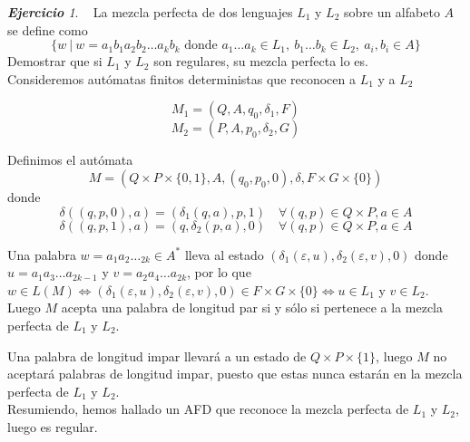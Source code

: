 \documentclass[12pt,spanish]{article}
\theoremstyle{definition}
\theoremstyle{remark}
\newtheorem{exercise}{\textbf{Ejercicio}}%
\begin{document}
\begin{exercise}~ La mezcla perfecta de dos lenguajes $L_1$ y $L_2$
  sobre un alfabeto $A$ se define como
  \[\{w \ | \ w=a_1b_1a_2b_2\ldots a_kb_k \text{ donde } a_1\ldots a_k
    \in L_1, \ b_1\ldots b_k \in L_2, \ a_i,b_i \in A\}\] Demostrar
  que si $L_1$ y $L_2$ son regulares, su mezcla perfecta lo es. \\

  Consideremos autómatas finitos deterministas que reconocen a $L_1$ y
  a $L_2$

  \[M_1=(Q,A,q_0,\delta_1,F)\]  
  \[M_2=(P,A,p_0,\delta_2,G)\]

  Definimos el autómata
  \[M=(Q\times P\times \{0,1\},A,(q_0,p_0,0),\delta,F\times G\times \{0\})\]
  donde
  \[\delta((q,p,0),a)=(\delta_1(q,a),p,1) \quad \forall (q,p) \in Q\times P, a \in A\]
  \[\delta((q,p,1),a)=(q,\delta_2(p,a),0) \quad \forall (q,p) \in Q\times P, a \in A\]

  \vspace{3mm}

  Una palabra $w=a_1a_2\ldots _{2k} \in A^*$ lleva al estado
  $(\delta_1(\varepsilon,u),\delta_2(\varepsilon,v),0)$ donde $u=a_1a_3\ldots a_{2k-1}$ y
  $v=a_2a_4\ldots a_{2k}$, por lo que
  $w \in L(M) \Leftrightarrow (\delta_1(\varepsilon,u),\delta_2(\varepsilon,v),0) \in F\times G\times
  \{0\} \Leftrightarrow u \in L_1$ y $v \in L_2$. Luego $M$ acepta una
  palabra de longitud par si y sólo si pertenece a la mezcla perfecta
  de $L_1$ y $L_2$.
  
  Una palabra de longitud impar llevará a un estado de
  $Q\times P\times \{1\}$, luego $M$ no aceptará palabras de
  longitud impar, puesto que estas nunca estarán en la mezcla perfecta
  de $L_1$ y $L_2$. \\

  Resumiendo, hemos hallado un AFD que reconoce la mezcla perfecta de
  $L_1$ y $L_2$, luego es regular.
\end{exercise}
\end{document}
